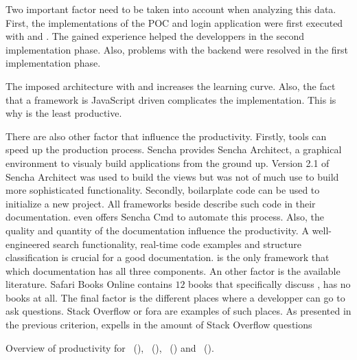 \documentclass[a4paper]{artikel3}
\begin{document}
Two important factor need to be taken into account when analyzing this data.
First,  the implementations of the POC and login application were first executed with \jqm{} and \st{}.
The gained experience helped the developpers in the second implementation phase.
Also,  problems with the backend were resolved in the first implementation phase.

The imposed architecture with \st{} and \kendo{} increases the learning curve.
Also, the fact that a framework is JavaScript driven complicates the implementation.
This is why \st{} is the least productive.

There are also other factor that influence the productivity.
Firstly,  tools can speed up the production process.
Sencha provides Sencha Architect,  a graphical environment to visualy build applications from the ground up.
Version 2.1 of Sencha Architect was used to build the views but was not of much use to build more sophisticated functionality.
Secondly,  boilarplate code can be used to initialize a new project.
All frameworks beside \lungo{} describe such code in their documentation.
\st{} even offers Sencha Cmd to automate this process.
Also, the quality and quantity of the documentation influence the productivity.
A well-engineered search functionality,  real-time code examples and structure classification is crucial for a good documentation.
\kendo{} is the only framework that which documentation has all three components.  
An other factor is the available literature.
Safari Books Online contains $12$ books that specifically discuss \jqm{},  \lungo{} has no books at all.
The final factor is the different places where a developper can go to ask questions.
Stack Overflow or fora are examples of such places. %
As presented in the previous criterion,  \jqm{} expells in the amount of Stack Overflow questions


\begin{table}
\centering
{}
\caption{Overview of productivity for \st{}~(\sta), \kendo{}~(\kendoa), \jqm{}~(\jqma) and \lungo{}~(\lungoa).}
\label{tabel:evaluatie-productiviteit}
\end{table}
\end{document}
